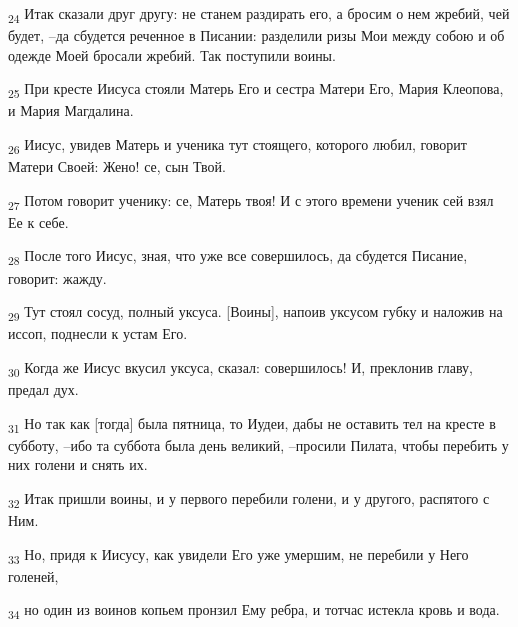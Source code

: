 \begin{tcolorbox}
\textsubscript{24} Итак сказали друг другу: не станем раздирать его, а бросим о нем жребий, чей будет, --да сбудется реченное в Писании: разделили ризы Мои между собою и об одежде Моей бросали жребий. Так поступили воины.
\end{tcolorbox}
\begin{tcolorbox}
\textsubscript{25} При кресте Иисуса стояли Матерь Его и сестра Матери Его, Мария Клеопова, и Мария Магдалина.
\end{tcolorbox}
\begin{tcolorbox}
\textsubscript{26} Иисус, увидев Матерь и ученика тут стоящего, которого любил, говорит Матери Своей: Жено! се, сын Твой.
\end{tcolorbox}
\begin{tcolorbox}
\textsubscript{27} Потом говорит ученику: се, Матерь твоя! И с этого времени ученик сей взял Ее к себе.
\end{tcolorbox}
\begin{tcolorbox}
\textsubscript{28} После того Иисус, зная, что уже все совершилось, да сбудется Писание, говорит: жажду.
\end{tcolorbox}
\begin{tcolorbox}
\textsubscript{29} Тут стоял сосуд, полный уксуса. [Воины], напоив уксусом губку и наложив на иссоп, поднесли к устам Его.
\end{tcolorbox}
\begin{tcolorbox}
\textsubscript{30} Когда же Иисус вкусил уксуса, сказал: совершилось! И, преклонив главу, предал дух.
\end{tcolorbox}
\begin{tcolorbox}
\textsubscript{31} Но так как [тогда] была пятница, то Иудеи, дабы не оставить тел на кресте в субботу, --ибо та суббота была день великий, --просили Пилата, чтобы перебить у них голени и снять их.
\end{tcolorbox}
\begin{tcolorbox}
\textsubscript{32} Итак пришли воины, и у первого перебили голени, и у другого, распятого с Ним.
\end{tcolorbox}
\begin{tcolorbox}
\textsubscript{33} Но, придя к Иисусу, как увидели Его уже умершим, не перебили у Него голеней,
\end{tcolorbox}
\begin{tcolorbox}
\textsubscript{34} но один из воинов копьем пронзил Ему ребра, и тотчас истекла кровь и вода.
\end{tcolorbox}
